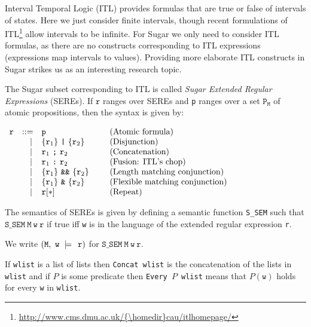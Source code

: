 \documentclass{llncs}
\newcommand{\CONCAT}[1]{\texttt{Concat}~#1}
\newcommand{\EVERY}[2]{\texttt{Every}~#1~#2}
\newcommand{\Ssem}{\texttt{S\_SEM}\xspace}
\newcommand{\sSem}[4]{(\tt{#1,~#2~\models^{\hspace*{-2.3mm}\raisebox{1mm}{\tt#3}}~#4})}
\renewcommand{\c}{{\hspace*{2.5mm}}}
\renewcommand{\t}[1]{\texttt{#1}}
\newcommand{\SC}{\texttt{;}}
\newcommand{\C}{\texttt{:}}
\begin{document}
Interval Temporal Logic (ITL) provides formulas that are true or false
of intervals of states.  Here we just consider finite intervals,
though recent formulations of ITL\footnote{\url{http://www.cms.dmu.ac.uk/{\homedir}cau/itlhomepage/}} 
allow intervals to be infinite. For
Sugar we only need to consider ITL formulas, as there are no constructs
corresponding to ITL expressions (expressions map intervals to
values). Providing more elaborate ITL constructs in Sugar strikes us as an interesting research topic.



The Sugar subset corresponding to ITL is called {\it Sugar Extended
Regular Expressions} (SEREs).  If $\t{r}$ ranges over SEREs and \t{p} ranges over a
set  $\t{P}_{\t{M}}$ of atomic propositions, then the syntax is given by:



\medskip

$\begin{array}{ccll}
{\t{r}} & {\rm ::=} & \t{p}
  & \mbox{\rm(Atomic formula)}\\
 & \phantom{\rm ::}\mid & \{{\t{r}}_1\}~\texttt{|}~\{{\t{r}}_2\}
  & \mbox{\rm(Disjunction)}\\
 & \phantom{\rm ::}\mid & {\t{r}}_1~{\bf{{\SC}}}~{\t{r}}_2~~~~~~~~~~~~
  & \mbox{\rm(Concatenation)}\\
 & \phantom{\rm ::}\mid & {\t{r}}_1~{\bf{{\C}}}~{\t{r}}_2
  & \mbox{\rm(Fusion: ITL's chop)}\\
 & \phantom{\rm ::}\mid & \{{\t{r}}_1\}~\texttt{\&\&}~\{{\t{r}}_2\}
  & \mbox{\rm(Length matching conjunction)}\\
 & \phantom{\rm ::}\mid & \{{\t{r}}_1\}~\texttt{\&}~\{{\t{r}}_2\}
  & \mbox{\rm(Flexible matching conjunction)}\\
 & \phantom{\rm ::}\mid & {\t{r}}{\bf{[*]}}
  & \mbox{\rm(Repeat)}\\
\end{array}$

\medskip

The semantics of SEREs 
is given by defining a semantic function \Ssem such that
$\Ssem~\t{M}~\t{w}~\t{r}$ if true iff \t{w} is in the language of the extended regular expression
\t{r}.  

We write $\sSem{M}{w}{\c}{r}$ for $\Ssem~\t{M}~\t{w}~\t{r}$.

If \texttt{wlist} is a list of lists then
\texttt{\CONCAT{wlist}} is the concatenation of the lists
in \texttt{wlist} and if $P$ is some predicate
then \texttt{\EVERY{$P$}wlist} means that $P(\texttt{w})$
holds for every \texttt{w} in \texttt{wlist}.
\end{document}
